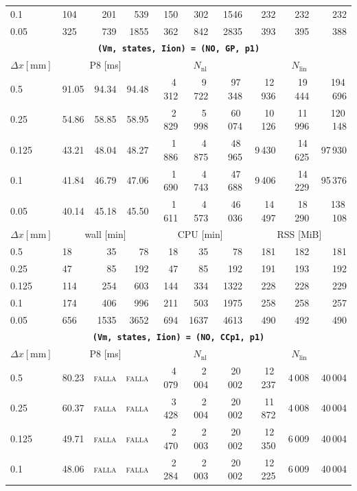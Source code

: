 \documentclass[11pt,a4paper]{article}
\newcommand{\code}[1]{\texttt{\small #1}}
\begin{document}
\begin{center}
\begin{longtable}{l|lrr|rrr|rrr}
0.1 & 104 & 201 & 539 & 150 & 302 & 1546 & 232 & 232 & 232\\
0.05 & 325 & 739 & 1855 & 362 & 842 & 2835 & 393 & 395 & 388\\
\hline
\hline
\multicolumn{10}{c}{\textbf{\code{(Vm, states, Iion) = (NO, GP, p1)}}}\\\hline
$ \Delta x [\text{mm}] $ & \multicolumn{3}{c|}{P8 [ms]} & \multicolumn{3}{c|}{$N_{\mathrm{nl}}$} & \multicolumn{3}{c|}{$N_{\mathrm{lin}}$}\\
0.5 & 91.05 & 94.34 & 94.48 & 4\,312 & 9\,722 & 97\,348 & 12\,936 & 19\,444 & 194\,696\\
0.25 & 54.86 & 58.85 & 58.95 & 2\,829 & 5\,998 & 60\,074 & 10\,126 & 11\,996 & 120\,148\\
0.125 & 43.21 & 48.04 & 48.27 & 1\,886 & 4\,875 & 48\,965 & 9\,430 & 14\,625 & 97\,930\\
0.1 & 41.84 & 46.79 & 47.06 & 1\,690 & 4\,743 & 47\,688 & 9\,406 & 14\,229 & 95\,376\\
0.05 & 40.14 & 45.18 & 45.50 & 1\,611 & 4\,573 & 46\,036 & 14\,497 & 18\,290 & 138\,108\\
\hline
$ \Delta x [\text{mm}] $ & \multicolumn{3}{c|}{wall [min]} & \multicolumn{3}{c|}{CPU [min]} & \multicolumn{3}{c|}{RSS [MiB]}\\
0.5 & 18 & 35 & 78 & 18 & 35 & 78 & 181 & 182 & 181\\
0.25 & 47 & 85 & 192 & 47 & 85 & 192 & 191 & 193 & 192\\
0.125 & 114 & 254 & 603 & 144 & 334 & 1322 & 228 & 228 & 229\\
0.1 & 174 & 406 & 996 & 211 & 503 & 1975 & 258 & 258 & 257\\
0.05 & 656 & 1535 & 3652 & 694 & 1637 & 4613 & 490 & 492 & 490\\
\hline
\hline
\multicolumn{10}{c}{\textbf{\code{(Vm, states, Iion) = (NO, CCp1, p1)}}}\\\hline
$ \Delta x [\text{mm}] $ & \multicolumn{3}{c|}{P8 [ms]} & \multicolumn{3}{c|}{$N_{\mathrm{nl}}$} & \multicolumn{3}{c|}{$N_{\mathrm{lin}}$}\\
0.5 & 80.23 & \textsc{falla} & \textsc{falla} & 4\,079 & 2\,004 & 20\,002 & 12\,237 & 4\,008 & 40\,004\\
0.25 & 60.37 & \textsc{falla} & \textsc{falla} & 3\,428 & 2\,004 & 20\,002 & 11\,872 & 4\,008 & 40\,004\\
0.125 & 49.71 & \textsc{falla} & \textsc{falla} & 2\,470 & 2\,003 & 20\,002 & 12\,350 & 6\,009 & 40\,004\\
0.1 & 48.06 & \textsc{falla} & \textsc{falla} & 2\,284 & 2\,003 & 20\,002 & 12\,225 & 6\,009 & 40\,004\\

\end{longtable}
\end{center}
\end{document}
